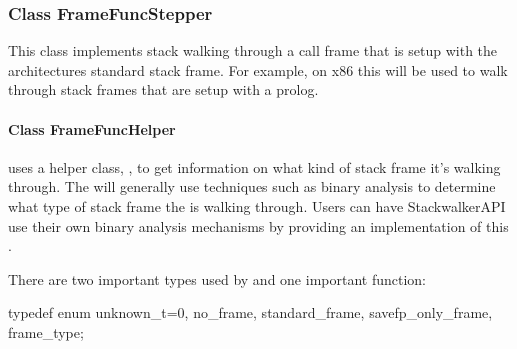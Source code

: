 \subsubsection{Class FrameFuncStepper}
This class implements stack walking through a call frame that is setup with the
architectures standard stack frame. For example, on x86 this  will
be used to walk through stack frames that are setup with a  prolog. 

\paragraph{Class FrameFuncHelper}

 uses a helper class, , to get information on
what kind of stack frame it's walking through. The  will
generally use techniques such as binary analysis to determine what type of stack
frame the  is walking through. Users can have StackwalkerAPI use
their own binary analysis mechanisms by providing an implementation of this
.

There are two important types used by  and one important function:
\begin{apient}
typedef enum {
    unknown_t=0,
    no_frame,
    standard_frame,
    savefp_only_frame,
} frame_type;
\end{apient}


